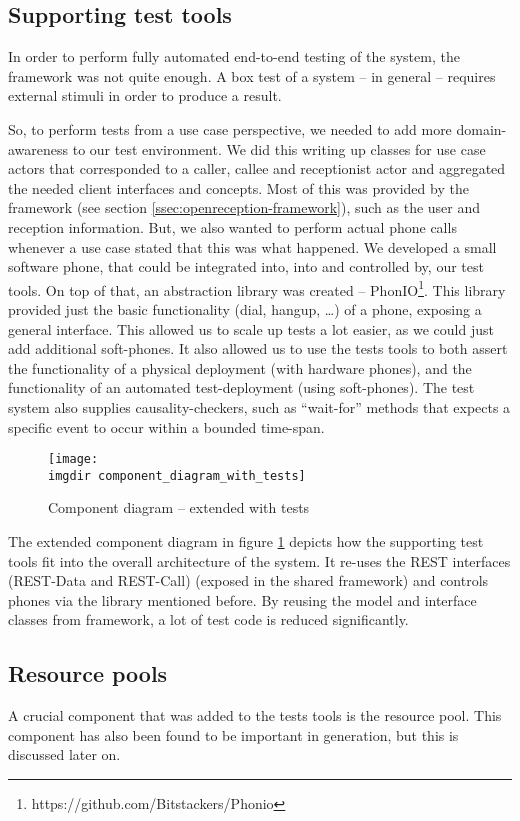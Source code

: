 \subsection{Supporting test tools}
\label{ssec:supporting-test-tools}
In order to perform fully automated end-to-end testing of the system, the framework was not quite enough. A box test of a system -- in general -- requires external stimuli in order to produce a result.\medskip

\noindent So, to perform tests from a use case perspective, we needed to add more domain-awareness to our test environment. We did this writing up classes for use case actors that corresponded to a caller, callee and receptionist actor and aggregated the needed client interfaces and concepts. Most of this was provided by the framework (see section \ref{ssec:openreception-framework}), such as the user and reception information. But, we also wanted to perform actual phone calls whenever a use case stated that this was what happened. We developed a small software phone, that could be integrated into, into and controlled by, our test tools. On top of that, an abstraction library was created -- PhonIO\footnote{https://github.com/Bitstackers/Phonio}. This library provided just the basic functionality (dial, hangup, \dots) of a phone, exposing a general interface. This allowed us to scale up tests a lot easier, as we could just add additional soft-phones. It also allowed us to use the tests tools to both assert the functionality of a physical deployment (with hardware phones), and the functionality of an automated test-deployment (using soft-phones). The test system also supplies causality-checkers, such as ``wait-for'' methods that expects a specific event to occur within a bounded time-span.\medskip
\begin{figure}[!htbp]
\centering
\texttt{[image: \\imgdir component\_diagram\_with\_tests]}
\caption{Component diagram -- extended with tests}
\label{fig:component_diagram_with_tests}
\end{figure}The extended component diagram in figure \ref{fig:component_diagram_with_tests} depicts how the supporting test tools fit into the overall architecture of the system. It re-uses the REST interfaces (REST-Data and REST-Call) (exposed in the shared framework) and controls phones via the library mentioned before. By reusing the model and interface classes from framework, a lot of test code is reduced significantly.
\subsection{Resource pools}
\label{ssec:resource-pools}
\noindent A crucial component that was added to the tests tools is the resource pool. This component has also been found to be important in generation, but this is discussed later on.\medskip

